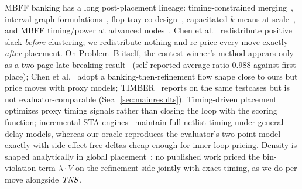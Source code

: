 MBFF banking has a long post-placement lineage: timing-constrained merging~\cite{chang2010postplacement}, interval-graph formulations~\cite{shyu2013effective}, flop-tray co-design~\cite{kahng2016floptray}, capacitated $k$-means at scale~\cite{kahng2024scalable}, and MBFF timing/power at advanced nodes~\cite{gong2025iscas}. Chen et al.~\cite{chen2024slackredist} redistribute positive slack \emph{before} clustering; we redistribute nothing and re-price every move exactly \emph{after} placement. On Problem~B itself, the contest winner's method appears only as a two-page late-breaking result~\cite{li2025lbr} (self-reported average ratio 0.988 against first place); Chen et al.~\cite{chen2026agile} adopt a banking-then-refinement flow shape close to ours but price moves with proxy models; TIMBER~\cite{dassarma2026timber} reports on the same testcases but is not evaluator-comparable (Sec.~\ref{sec:mainresults}). Timing-driven placement~\cite{liao2022dreamplace4,date2025tddp,romanvicharra2024ffcentric} optimizes proxy timing signals rather than closing the loop with the scoring function; incremental STA engines~\cite{huang2015opentimer,huang2021opentimer2} maintain full-netlist timing under general delay models, whereas our oracle reproduces the evaluator's two-point model exactly with side-effect-free deltas cheap enough for inner-loop pricing. Density is shaped analytically in global placement~\cite{lu2015eplace,chen2008ntuplace3}; no published work priced the bin-violation term $\lambda\cdot V$ on the refinement side jointly with exact timing, as we do per move alongside $\mathit{TNS}$.
